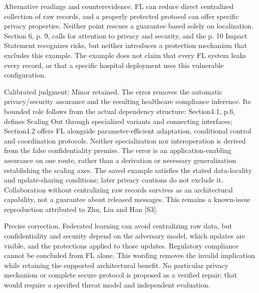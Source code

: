 \documentclass[10pt]{article}
\begin{document}
Alternative readings and counterevidence. FL can reduce direct centralized collection of raw records, and a properly protected protocol can offer specific privacy properties. Neither point rescues a guarantee based solely on localization. Section 6, p. 9, calls for attention to privacy and security, and the p. 10 Impact Statement recognizes risks, but neither introduces a protection mechanism that excludes this example. The example does not claim that every FL system leaks every record, or that a specific hospital deployment uses this vulnerable configuration.\par
Calibrated judgment: Minor retained. The error removes the automatic privacy/security assurance and the resulting healthcare compliance inference. Its bounded role follows from the actual dependency structure: Section4.1, p.6, defines Scaling Out through specialized variants and connecting interfaces; Section4.2 offers FL alongside parameter-efficient adaptation, conditional control and coordination protocols. Neither specialization nor interoperation is derived from the false confidentiality premise. The error is an application-enabling assurance on one route, rather than a derivation or necessary generalization establishing the scaling axes. The saved example satisfies the stated data-locality and update-sharing conditions; later privacy cautions do not exclude it. Collaboration without centralizing raw records survives as an architectural capability, not a guarantee about released messages. This remains a known-issue reproduction attributed to Zhu, Liu and Han [S3].\par
Precise correction. Federated learning can avoid centralizing raw data, but confidentiality and security depend on the adversary model, which updates are visible, and the protections applied to those updates. Regulatory compliance cannot be concluded from FL alone. This wording removes the invalid implication while retaining the supported architectural benefit. No particular privacy mechanism or complete secure protocol is proposed as a verified repair; that would require a specified threat model and independent evaluation.\par
\end{document}
